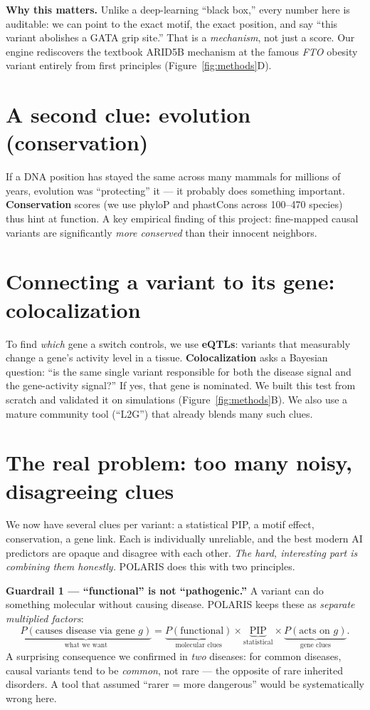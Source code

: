 \documentclass[11pt]{article}
\newcommand{\term}[1]{\textbf{\color{navy}#1}}
\begin{document}
\begin{key}
\textbf{Why this matters.} Unlike a deep-learning ``black box,'' every number here is auditable: we can
point to the exact motif, the exact position, and say ``this variant abolishes a GATA grip site.'' That is
a \emph{mechanism}, not just a score. Our engine rediscovers the textbook ARID5B mechanism at the famous
\emph{FTO} obesity variant entirely from first principles (Figure~\ref{fig:methods}D).
\end{key}

\section{A second clue: evolution (conservation)}
If a DNA position has stayed the same across many mammals for millions of years, evolution was
``protecting'' it --- it probably does something important. \term{Conservation} scores (we use phyloP and
phastCons across 100--470 species) thus hint at function. A key empirical finding of this project:
fine-mapped causal variants are significantly \emph{more conserved} than their innocent neighbors.

\section{Connecting a variant to its gene: colocalization}
To find \emph{which} gene a switch controls, we use \term{eQTLs}: variants that measurably change a gene's
activity level in a tissue. \term{Colocalization} asks a Bayesian question: ``is the same single variant
responsible for both the disease signal and the gene-activity signal?'' If yes, that gene is nominated. We
built this test from scratch and validated it on simulations (Figure~\ref{fig:methods}B). We also use a
mature community tool (``L2G'') that already blends many such clues.

\section{The real problem: too many noisy, disagreeing clues}
We now have several clues per variant: a statistical PIP, a motif effect, conservation, a gene link.
Each is individually unreliable, and the best modern AI predictors are opaque and disagree with each
other. \emph{The hard, interesting part is combining them honestly.} POLARIS does this with two principles.

\begin{key}
\textbf{Guardrail 1 --- ``functional'' is not ``pathogenic.''} A variant can do something molecular without
causing disease. POLARIS keeps these as \emph{separate multiplied factors}:
\[ \underbrace{P(\text{causes disease via gene } g)}_{\text{what we want}}
   = \underbrace{P(\text{functional})}_{\text{molecular clues}}\times
     \underbrace{\text{PIP}}_{\text{statistical}}\times
     \underbrace{P(\text{acts on } g)}_{\text{gene clues}}. \]
A surprising consequence we confirmed in \emph{two} diseases: for common diseases, causal variants tend to
be \emph{common}, not rare --- the opposite of rare inherited disorders. A tool that assumed ``rarer =
more dangerous'' would be systematically wrong here.
\end{key}
\end{document}
